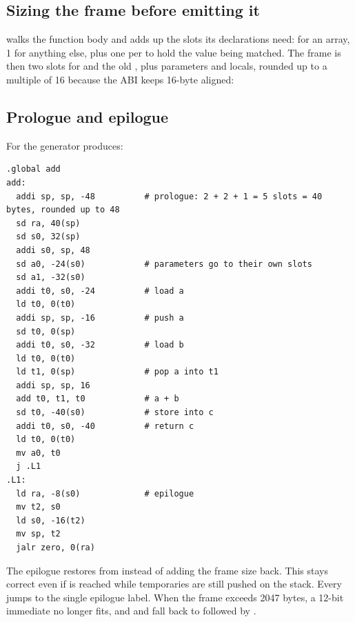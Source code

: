 \documentclass[12pt]{article}
\begin{document}
\subsection{Sizing the frame before emitting it}


 walks the function body and adds up the slots its declarations need:  for an
array, 1 for anything else, plus one per  to hold the value being matched. The frame is then
two slots for  and the old , plus parameters and locals, rounded up to a multiple of 16
because the ABI keeps  16-byte aligned:


\subsection{Prologue and epilogue}


For  the generator produces:

\begin{lstlisting}[language=riscv,title={\codetitle{codegen.S (RV64), comments added}}]
.global add
add:
  addi sp, sp, -48          # prologue: 2 + 2 + 1 = 5 slots = 40 bytes, rounded up to 48
  sd ra, 40(sp)
  sd s0, 32(sp)
  addi s0, sp, 48
  sd a0, -24(s0)            # parameters go to their own slots
  sd a1, -32(s0)
  addi t0, s0, -24          # load a
  ld t0, 0(t0)
  addi sp, sp, -16          # push a
  sd t0, 0(sp)
  addi t0, s0, -32          # load b
  ld t0, 0(t0)
  ld t1, 0(sp)              # pop a into t1
  addi sp, sp, 16
  add t0, t1, t0            # a + b
  sd t0, -40(s0)            # store into c
  addi t0, s0, -40          # return c
  ld t0, 0(t0)
  mv a0, t0
  j .L1
.L1:
  ld ra, -8(s0)             # epilogue
  mv t2, s0
  ld s0, -16(t2)
  mv sp, t2
  jalr zero, 0(ra)
\end{lstlisting}

The epilogue restores  from  instead of adding the frame size back. This stays correct
even if  is reached while temporaries are still pushed on the stack. Every 
jumps to the single epilogue label. When the frame exceeds 2047 bytes, a 12-bit immediate no longer fits,
and  and  fall back to  followed by .
\end{document}
